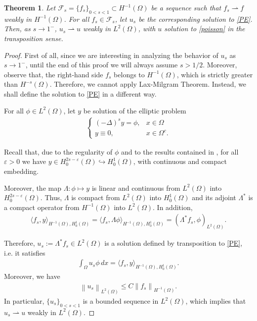 \documentclass[reqno,twoside]{amsart}
\newtheorem{theorem}{Theorem}[section]
\numberwithin{equation}{section}
\newcommand{\norm}[2]{{\left\|#1\right\|}_{#2}}
\newcommand{\fl}[2]{(-\Delta)^#1#2}
\begin{document}
\begin{theorem}\label{limit_thm_weak}
Let $\mathcal F_s=\{f_s\}_{0<s<1}\subset H^{-1}(\Omega)$ be a sequence such that $f_s\rightharpoonup f$ weakly in $H^{-1}(\Omega)$. For all $f_s\in\mathcal F_s$, let $u_s$ be the corresponding solution to \eqref{PE}. Then, as $s\to 1^-$, $u_s\rightharpoonup u$ weakly in $L^2(\Omega)$, with $u$ solution to \eqref{poisson} in the transposition sense.
\end{theorem}

\begin{proof}
First of all, since we are interesting in analyzing the behavior of $u_s$ as $s\to 1^-$, until the end of this proof we will always assume $s>1/2$. Moreover, observe that, the right-hand side $f_s$ belongs to $H^{-1}(\Omega)$, which is strictly greater than $H^{-s}(\Omega)$. Therefore, we cannot apply Lax-Milgram Theorem. Instead, we shall define the solution to \eqref{PE} in a different way.

For all $\phi\in L^2(\Omega)$, let $y$ be solution of the elliptic problem 
\begin{align}\label{PE_transp}
	\begin{cases}
		\fl{s}{y}=\phi, & x\in\Omega
		\\
		y \equiv 0, & x\in\Omega^c.
	\end{cases}
\end{align}

Recall that, due to the regularity of $\phi$ and to the results contained in \cite{biccari2017local,cozzi2017interior}, for all $\varepsilon>0$ we have $y\in H^{2s-\varepsilon}_0(\Omega)\hookrightarrow H^1_0(\Omega)$, with continuous and compact embedding. 

Moreover, the map $\Lambda: \phi\mapsto y$ is linear and continuous from $L^2(\Omega)$ into $H^{2s-\varepsilon}_0(\Omega)$. Thus, $\Lambda$ is compact from $L^2(\Omega)$ into $H^1_0(\Omega)$ and its adjoint $\Lambda^*$ is a compact operator from $H^{-1}(\Omega)$ into $L^2(\Omega)$. In addition, 
\begin{align*}
	\langle f_s,y\rangle_{H^{-1}(\Omega),H^1_0(\Omega)} = \langle f_s,\Lambda \phi\rangle_{H^{-1}(\Omega),H^1_0(\Omega)} = (\Lambda^* f_s,\phi)_{L^2(\Omega)}.
\end{align*}

Therefore, $u_s:=\Lambda^*f_s\in L^2(\Omega)$ is a solution defined by transposition to \eqref{PE}, i.e. it satisfies
\begin{align}\label{transp_def_s}
	\int_\Omega u_s\phi\,dx = \langle f_s,y\rangle_{H^{-1}(\Omega),H^1_0(\Omega)}. 
\end{align}
Moreover, we have 
\begin{align}\label{us_norm}
	\norm{u_s}{L^2(\Omega)} \leq C\norm{f_s}{H^{-1}(\Omega)}.
\end{align}
In particular, $\{u_s\}_{0<s<1}$ is a bounded sequence in $L^2(\Omega)$, which implies that $u_s\rightharpoonup u$ weakly in $L^2(\Omega)$.


\end{proof}
\end{document}
